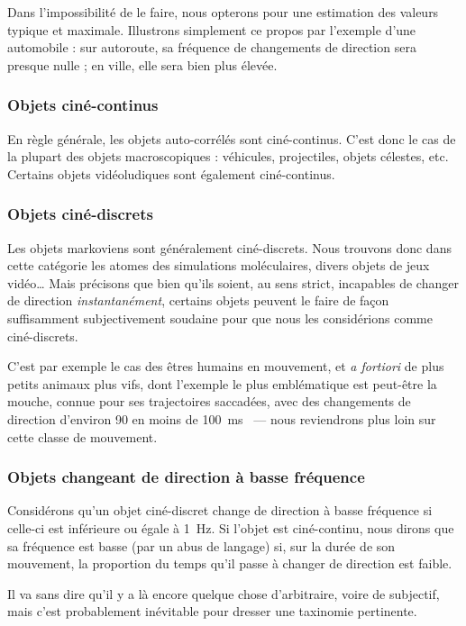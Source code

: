 	Dans l'impossibilité de le faire, nous opterons pour une estimation des valeurs \og typique \fg{} et maximale. Illustrons simplement ce propos par l'exemple d'une automobile : sur autoroute, sa fréquence de changements de direction sera presque nulle ; en ville, elle sera bien plus élevée.
	
	\subsubsection{Objets ciné-continus}
	En règle générale, les objets auto-corrélés sont ciné-continus. C'est donc le cas de la plupart des objets macroscopiques : véhicules, projectiles, objets célestes, etc. Certains objets vidéoludiques sont également ciné-continus.
	
	\subsubsection{Objets ciné-discrets}
	Les objets markoviens sont généralement ciné-discrets. Nous trouvons donc dans cette catégorie les atomes des simulations moléculaires, divers objets de jeux vidéo\ldots{} Mais précisons que bien qu'ils soient, au sens strict, incapables de changer de direction \emph{instantanément}, certains objets peuvent le faire de façon suffisamment subjectivement soudaine pour que nous les considérions comme ciné-discrets.
	
	C'est par exemple le cas des êtres humains en mouvement, et \emph{a fortiori} de plus petits animaux plus vifs, dont l'exemple le plus emblématique est peut-être la mouche, connue pour ses trajectoires saccadées, avec des changements de direction d'environ 90\textdegree{} en moins de 100~ms~\cite{tammero2002influence, collett1975visual, wagner1986flight, schilstra1999blowfly} --- nous reviendrons plus loin sur cette classe de mouvement.
	
	\subsubsection{Objets changeant de direction à basse fréquence}
	Considérons qu'un objet ciné-discret change de direction à basse fréquence si celle-ci est inférieure ou égale à 1~Hz. Si l'objet est ciné-continu, nous dirons que sa fréquence est basse (par un abus de langage) si, sur la durée de son mouvement, la proportion du temps qu'il passe à changer de direction est faible.
	
	Il va sans dire qu'il y a là encore quelque chose d'arbitraire, voire de subjectif, mais c'est probablement inévitable pour dresser une taxinomie pertinente.
	

